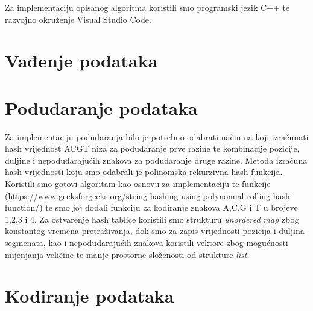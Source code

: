 Za implementaciju opisanog algoritma koristili smo programski jezik C++ te razvojno okruženje Visual Studio Code.

\section{Vađenje podataka}

\section{Podudaranje podataka}
Za implementaciju podudaranja bilo je potrebno odabrati način na koji izračunati hash vrijednost ACGT niza za podudaranje prve razine te kombinacije pozicije, duljine i nepodudarajućih znakova za podudaranje druge razine. Metoda izračuna hash vrijednosti koju smo odabrali je polinomska rekurzivna hash funkcija. Koristili smo gotovi algoritam kao osnovu za implementaciju te funkcije (https://www.geeksforgeeks.org/string-hashing-using-polynomial-rolling-hash-function/) te smo joj dodali funkciju za kodiranje znakova A,C,G i T u brojeve 1,2,3 i 4.
Za ostvarenje hash tablice koristili smo strukturu \textit{unordered map} zbog konstantog vremena pretraživanja, dok smo za zapis vrijednosti pozicija i duljina segmenata, kao i nepodudarajućih znakova koristili vektore zbog mogućnosti mijenjanja veličine te manje prostorne složenosti od strukture \textit{list}.

\section{Kodiranje podataka}